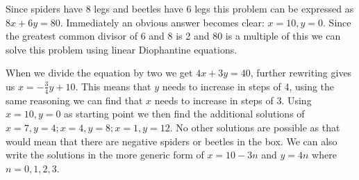 Since spiders have 8 legs and beetles have 6 legs this problem can be expressed as $8x + 6y = 80$. Immediately an obvious answer becomes clear: $x=10, y=0$. Since the greatest common divisor of 6 and 8 is 2 and 80 is a multiple of this we can solve this problem using linear Diophantine equations.

When we divide the equation by two we get $4x + 3y = 40$, further rewriting gives us $x = -\frac{3}{4}y + 10$. This means that $y$ needs to increase in steps of 4, using the same reasoning we can find that $x$ needs to increase in steps of 3. Using $x=10, y=0$ as starting point we then find the additional solutions of $x=7, y=4; x=4, y=8; x=1, y=12$. No other solutions are possible as that would mean that there are negative spiders or beetles in the box. We can also write the solutions in the more generic form of $x = 10 - 3n$ and $y = 4n$ where $n = 0, 1, 2, 3$.